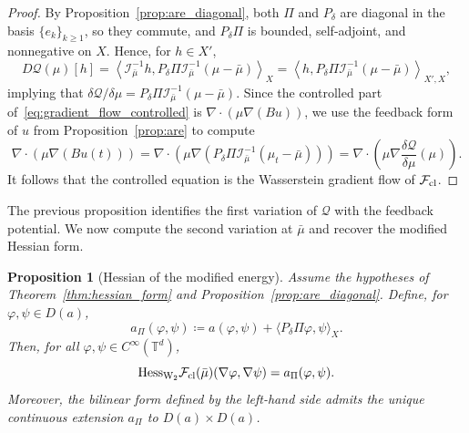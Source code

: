 \documentclass[11pt]{article}
\numberwithin{equation}{section}
\newtheorem{proposition}[theorem]{Proposition}
\theoremstyle{definition}
\newcommand{\T}{\mathbb{T}}
\newcommand{\F}{\mathcal{F}}
\newcommand{\Wtwo}{\operatorname{W}_2}
\newcommand{\rieszmap}[1][\mu]{\mathcal{I}_{#1}}
\begin{document}
\begin{proof}
    By Proposition~\ref{prop:are_diagonal}, both $\Pi$ and $P_\delta$ are diagonal in the basis $\{e_k\}_{k \ge 1}$, so they commute, and $P_\delta \Pi$ is bounded, self-adjoint, and nonnegative on $X$.
    Hence, for $h \in X'$,
    \[
    D\mathcal{Q}(\mu)[h] = \left\langle \rieszmap[\bar\mu]^{-1}h, P_\delta \Pi \rieszmap[\bar\mu]^{-1}(\mu-\bar\mu) \right\rangle_X = \left\langle h,
    P_\delta \Pi \rieszmap[\bar\mu]^{-1}(\mu-\bar\mu)\right\rangle_{X',X},
    \]
    implying that $\delta\mathcal{Q}/\delta\mu = P_\delta \Pi \rieszmap[\bar\mu]^{-1}(\mu-\bar\mu)$.
    Since the controlled part of~\eqref{eq:gradient_flow_controlled} is $\nabla \cdot (\mu \nabla (Bu))$, we use the feedback form of $u$ from Proposition~\ref{prop:are} to compute
    \[
    \nabla \cdot (\mu \nabla (Bu(t))) = \nabla \cdot \left(\mu \nabla \left(P_\delta \Pi \rieszmap[\bar\mu]^{-1}(\mu_t-\bar\mu)\right)\right) = \nabla \cdot \left(\mu \nabla \frac{\delta\mathcal{Q}}{\delta\mu}(\mu)\right).
    \]
    It follows that the controlled equation is the Wasserstein gradient flow of $\F_{\rm cl}$.
\end{proof}

The previous proposition identifies the first variation of $\mathcal{Q}$ with the feedback potential.
We now compute the second variation at $\bar\mu$ and recover the modified Hessian form.

\begin{proposition}[Hessian of the modified energy]
\label{prop:closed_loop_hessian}
    Assume the hypotheses of Theorem~\ref{thm:hessian_form} and Proposition~\ref{prop:are_diagonal}.
    Define, for $\varphi, \psi \in D(a)$,
    \[
    a_\Pi(\varphi, \psi) \coloneqq a(\varphi, \psi) + \langle P_\delta \Pi \varphi, \psi\rangle_X.
    \]
    Then, for all $\varphi, \psi \in C^{\infty}(\T^d)$,
    \[
    \mathrm{Hess}_{\Wtwo} \F_{\rm cl}(\bar\mu)(\nabla \varphi, \nabla \psi) = a_\Pi(\varphi, \psi).
    \]
    Moreover, the bilinear form defined by the left-hand side admits the unique continuous extension $a_\Pi$ to $D(a)\times D(a)$.
\end{proposition}
\end{document}
